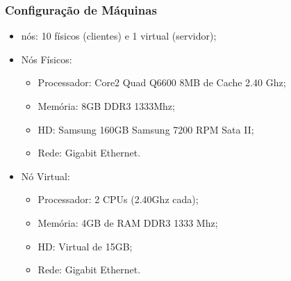 \documentclass{beamer}
\begin{document}
\begin{frame} \frametitle{Configuração de Máquinas}
\begin{itemize}
  \item {} nós: 10 físicos (clientes) e 1 virtual (servidor);
	\item Nós Físicos:
	\begin{itemize}
  		\item Processador: Core2 Quad Q6600 8MB de Cache 2.40 Ghz;
  		\item Memória: 8GB DDR3 1333Mhz;
  		\item HD: Samsung 160GB Samsung 7200 RPM Sata II;
  		\item Rede: Gigabit Ethernet.
	\end{itemize}

	\item Nó Virtual:
	\begin{itemize}
  		\item Processador: 2 CPUs (2.40Ghz cada);
 		\item Memória: 4GB de RAM DDR3 1333 Mhz;
  		\item HD: Virtual de 15GB;
  		\item Rede: Gigabit Ethernet.
	\end{itemize}
\end{itemize}
\end{frame}
\end{document}
